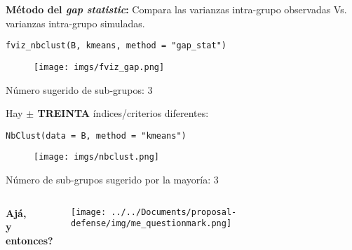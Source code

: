 \documentclass[10pt, aspectratio=169]{beamer}
\begin{document}
{
\begin{frame}[fragile]{}
\vspace{0.3cm}
\textcolor{UltraViolet}{\textbf{\large Método del \textit{gap statistic}:}} Compara las varianzas intra-grupo observadas Vs. varianzas intra-grupo simuladas.
\begin{verbatim}
fviz_nbclust(B, kmeans, method = "gap_stat")
\end{verbatim}
\pause
\begin{figure}
 \texttt{[image: imgs/fviz\_gap.png]}
\end{figure}
\pause
\vspace{-0.2cm}
Número sugerido de sub-grupos: 3
\end{frame}
}

{
\begin{frame}[fragile]{}
\vspace{0.3cm}
Hay \textcolor{UltraViolet}{\textbf{\large $\pm$ TREINTA}} índices/criterios diferentes:
\begin{verbatim}
NbClust(data = B, method = "kmeans")
\end{verbatim}
\pause
\begin{figure}
 \texttt{[image: imgs/nbclust.png]}
\end{figure}
\pause
\vspace{-0.2cm}
Número de sub-grupos sugerido por la mayoría: 3
\end{frame}
}

\begin{frame}[plain]
\vspace{1cm}
\begin{columns}
 \begin{center}
  \vspace{-3cm}
  \textbf{\Huge{Ajá,\\
  \vspace{0.5cm}
  y entonces?}}\\
  \vspace{1cm}
 \end{center}
 \texttt{[image: ../../Documents/proposal-defense/img/me\_questionmark.png]}
\end{columns}
\end{frame}
\end{document}
